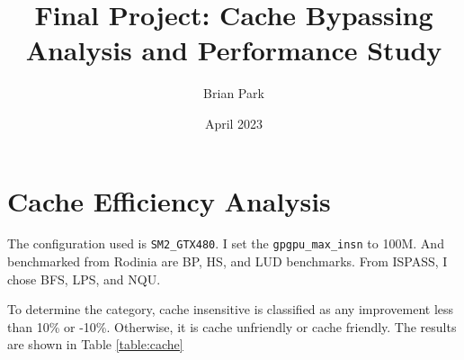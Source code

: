 \documentclass{article}
\title{Final Project: Cache Bypassing Analysis and Performance Study}
\author{Brian Park}
\affil{North Carolina State University, Computer Engineering 786}
\date{April 2023}
\begin{document}
\maketitle

\section{Cache Efficiency Analysis}

The configuration used is \verb|SM2_GTX480|. I set the \verb|gpgpu_max_insn| to 100M. And benchmarked from Rodinia are BP, HS, and LUD benchmarks. From ISPASS, I chose BFS, LPS, and NQU.

To determine the category, cache insensitive is classified as any improvement less than 10\% or -10\%. Otherwise, it is cache unfriendly or cache friendly. The results are shown in Table \ref{table:cache}
\end{document}
